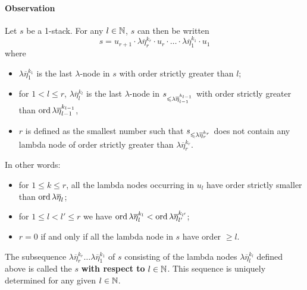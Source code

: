 \documentclass[a4paper]{article}[12pt]
\theoremstyle{remark}
\theoremstyle{definition}
\begin{document}
\paragraph{Observation}
Let $s$ be a 1-stack. For any $l\in \mathbb{N}$, $s$ can then be written
$$ s = u_{r+1} \cdot \lambda \overline{\eta}_r^{k_r} \cdot u_r \cdot
\ldots \cdot \lambda \overline{\eta}_1^{k_1} \cdot  u_1 $$
where
\begin{itemize}
\item  $\lambda \overline{\eta}_1^{k_1}$ is the
last $\lambda$-node in $s$ with order strictly greater than $l$;

\item for $1 < l \leq r$, $\lambda
\overline{\eta}_l^{k_l}$ is the last $\lambda$-node in $s_{\leqslant
\lambda \overline{\eta}_{l-1}^{k_{l-1}}}$ with order strictly
greater than $\mathop{\mathrm{ord}}{\lambda \overline{\eta}_{l-1}^{k_{l-1}}}$,

\item  $r$ is defined as the smallest number such that
$s_{\leqslant \lambda \overline{\eta}_{r}^{k_{r}}}$ does not contain
any lambda node of order strictly greater than $\lambda
\overline{\eta}_{r}^{k_{r}}$.
\end{itemize}

\noindent In other words:
\begin{itemize}
\item for $1 \leq k \leq r$, all the lambda nodes occurring in $u_l$ have order
strictly smaller than $\mathop{\mathrm{ord}}{\lambda \overline{\eta}_l}$;
\item for $1\leq l<l'\leq r$ we have $\mathop{\mathrm{ord}}{\lambda \overline{\eta}_l^{k_l}}
< \mathop{\mathrm{ord}}{\lambda \overline{\eta}_{l'}^{k_{l'}}}$;
\item $r=0$ if and only if all the lambda node in $s$ have order $\geq l$.
\end{itemize}

The subsequence $\lambda \overline{\eta}_r^{k_r} \ldots \lambda\overline{\eta}_1^{k_1}$ of $s$ consisting of the lambda nodes $\lambda
\overline{\eta}_l^{k_l}$ defined above is called the  $s$ {\bf with respect to} $l\in\mathbb{N}$.
This sequence is uniquely determined for any given $l\in \mathbb{N}$.

\smallskip
\end{document}
